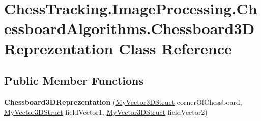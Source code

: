 \hypertarget{class_chess_tracking_1_1_image_processing_1_1_chessboard_algorithms_1_1_chessboard3_d_reprezentation}{}\section{Chess\+Tracking.\+Image\+Processing.\+Chessboard\+Algorithms.\+Chessboard3\+D\+Reprezentation Class Reference}
\label{class_chess_tracking_1_1_image_processing_1_1_chessboard_algorithms_1_1_chessboard3_d_reprezentation}
\subsection*{Public Member Functions}
\begin{DoxyCompactItemize}
\item 
\mbox{\label{class_chess_tracking_1_1_image_processing_1_1_chessboard_algorithms_1_1_chessboard3_d_reprezentation_af178598f00d9860b3c66c2bf2a6b83a3}} 
{\bfseries Chessboard3\+D\+Reprezentation} (\mbox{\hyperlink{class_chess_tracking_1_1_utils_1_1_my_vector3_d_struct}{My\+Vector3\+D\+Struct}} corner\+Of\+Chessboard, \mbox{\hyperlink{class_chess_tracking_1_1_utils_1_1_my_vector3_d_struct}{My\+Vector3\+D\+Struct}} field\+Vector1, \mbox{\hyperlink{class_chess_tracking_1_1_utils_1_1_my_vector3_d_struct}{My\+Vector3\+D\+Struct}} field\+Vector2)
\end{DoxyCompactItemize}
